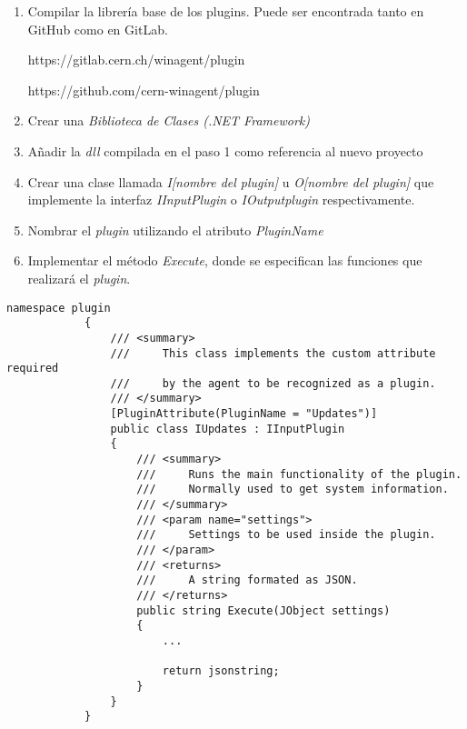         \begin{enumerate}
            \item Compilar la librería base de los plugins. Puede ser encontrada tanto en GitHub como en GitLab.
            
            https://gitlab.cern.ch/winagent/plugin
            
            https://github.com/cern-winagent/plugin
            
            \item Crear una \textit{Biblioteca de Clases (.NET Framework)}
            
            \item Añadir la \textit{dll} compilada en el paso 1 como referencia al nuevo proyecto
            
            \item Crear una clase llamada \textit{I[nombre del plugin]} u \textit{O[nombre del plugin]} que implemente la interfaz \textit{IInputPlugin} o \textit{IOutputplugin} respectivamente.
            
            \item Nombrar el \textit{plugin} utilizando el atributo \textit{PluginName} 
            
            \item Implementar el método \textit{Execute}, donde se especifican las funciones que realizará el \textit{plugin}.
        \end{enumerate}
    
        \begin{lstlisting}[style=csharp, caption=Plugin de entrada]
            namespace plugin
            {
                /// <summary>
                ///     This class implements the custom attribute required
                ///     by the agent to be recognized as a plugin.
                /// </summary>
                [PluginAttribute(PluginName = "Updates")]
                public class IUpdates : IInputPlugin
                {
                    /// <summary>
                    ///     Runs the main functionality of the plugin.
                    ///     Normally used to get system information.
                    /// </summary>
                    /// <param name="settings">
                    ///     Settings to be used inside the plugin.
                    /// </param>
                    /// <returns>
                    ///     A string formated as JSON.
                    /// </returns>
                    public string Execute(JObject settings)
                    {
                        ...
            
                        return jsonstring;
                    }
                }
            }
        \end{lstlisting}
        

